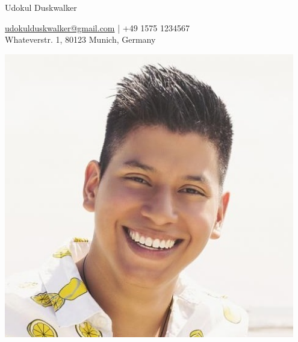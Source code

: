 \documentclass[a4paper,11pt]{article}
\begin{document}
  \begin{minipage}{0.69\textwidth}
    \begin{centering}
      {\Huge Udokul Duskwalker}

      \href{mailto:udokulduskwalker@gmail.com}{udokulduskwalker@gmail.com} | +49 1575 1234567\\
      Whateverstr. 1, 80123 Munich, Germany
      
    \end{centering}
  \end{minipage}
  \begin{minipage}{0.3\textwidth}
    \includegraphics[width=0.95\textwidth]{photo}
  \end{minipage}
  
\end{document}
